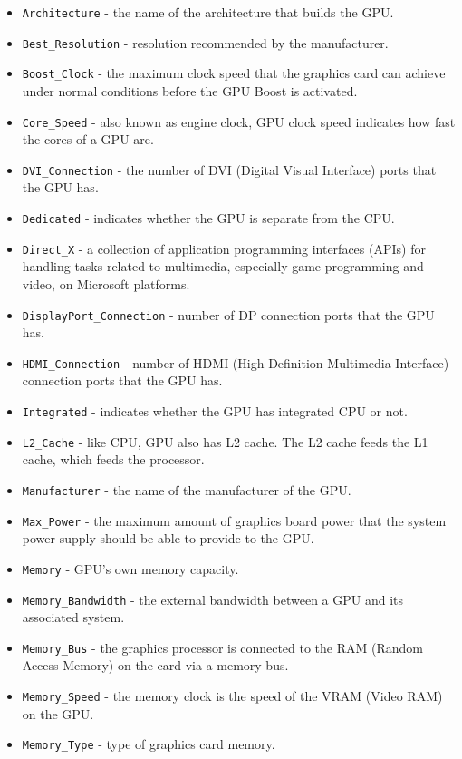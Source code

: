 \documentclass[a4paper]{article}
\theoremstyle{definition}
\begin{document}
\begin{itemize}
    \item \verb|Architecture| - the name of the architecture that builds the GPU.
    \item \verb|Best_Resolution| - resolution recommended by the manufacturer.
    \item \verb|Boost_Clock| - the maximum clock speed that the graphics card can achieve under normal conditions before the GPU Boost is activated.
    \item \verb|Core_Speed| - also known as engine clock, GPU clock speed indicates how fast the cores of a GPU are.
    \item \verb|DVI_Connection| - the number of DVI (Digital Visual Interface) ports that the GPU has.
    \item \verb|Dedicated| - indicates whether the GPU is separate from the CPU.
    \item \verb|Direct_X| - a collection of application programming interfaces (APIs) for handling tasks related to multimedia, especially game programming and video, on Microsoft platforms.
    \item \verb|DisplayPort_Connection| - number of DP connection ports that the GPU has.
    \item \verb|HDMI_Connection| - number of HDMI (High-Definition Multimedia Interface) connection ports that the GPU has.
    \item \verb|Integrated| - indicates whether the GPU has integrated CPU or not.
    \item \verb|L2_Cache| - like CPU, GPU also has L2 cache. The L2 cache feeds the L1 cache, which feeds the processor.
    \item \verb|Manufacturer| - the name of the manufacturer of the GPU.
    \item \verb|Max_Power| - the maximum amount of graphics board power that the system power supply should be able to provide to the GPU.
    \item \verb|Memory| - GPU's own memory capacity.
    \item \verb|Memory_Bandwidth| - the external bandwidth between a GPU and its associated system.
    \item \verb|Memory_Bus| - the graphics processor is connected to the RAM (Random Access Memory) on the card via a memory bus.
    \item \verb|Memory_Speed| - the memory clock is the speed of the VRAM (Video RAM) on the GPU.
    \item \verb|Memory_Type| - type of graphics card memory.

\end{itemize}
\end{document}
